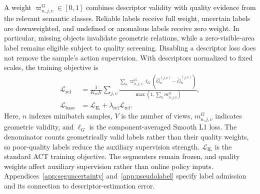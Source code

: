 A weight $\varpi_{n,j,v}^{G}\in[0,1]$ combines descriptor validity with quality evidence from the relevant semantic classes.
Reliable labels receive full weight, uncertain labels are downweighted, and undefined or anomalous labels receive zero weight.
In particular, missing objects invalidate geometric relations, while a zero-visible-area label remains eligible subject to quality screening.
Disabling a descriptor loss does not remove the sample's action supervision.
With descriptors normalized to fixed scales, the training objective is
\begin{align}
 \mathcal L_{\mathrm{rel}}
 &=\frac{1}{K_{\mathrm{rel}}V}\sum_{j,v}
   \frac{\sum_n\varpi_{n,j,v}^{G}
      \ell_G(\widehat G_n^{(j,v)}-\widetilde G_n^{(j,v)})}
        {\max(1,\sum_n m_{n,j,v}^{G})},\nonumber\\
 \mathcal L_{\mathrm{base}}
 &=\mathcal L_{\mathrm{IL}}
   +\lambda_{\mathrm{rel}}\mathcal L_{\mathrm{rel}}.
 \label{eq:methodbaseloss}
\end{align}
Here, $n$ indexes minibatch samples, $V$ is the number of views, $m_{n,j,v}^{G}$ indicates geometric validity, and $\ell_G$ is the component-averaged Smooth L1 loss.
The denominator counts geometrically valid labels rather than their quality weights, so poor-quality labels reduce the auxiliary supervision strength.
$\mathcal L_{\mathrm{IL}}$ is the standard ACT training objective.
The segmenters remain frozen, and quality weights affect auxiliary supervision rather than online policy inputs.
Appendices~\ref{app:seguncertainty} and~\ref{app:pseudolabel} specify label admission and its connection to descriptor-estimation error.


